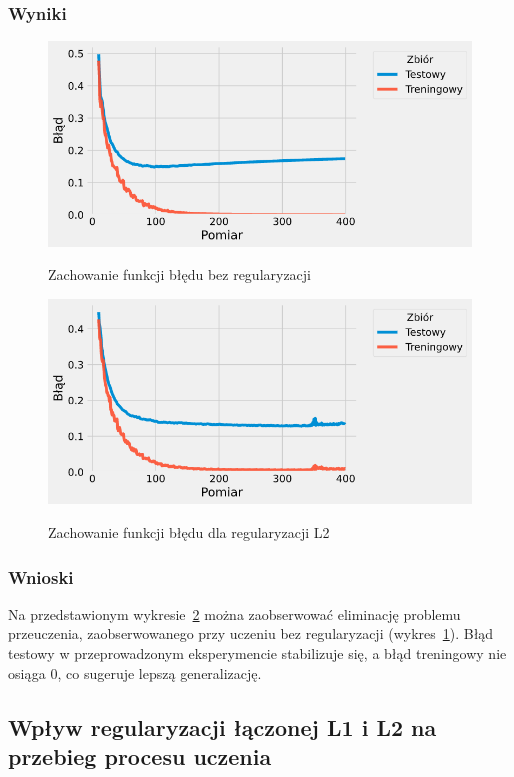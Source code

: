 \documentclass{article}
\begin{document}
\subsubsection*{Wyniki}
\begin{figure}[H]
	\centering
	\caption{Zachowanie funkcji błędu bez regularyzacji}
	\includegraphics[width=\textwidth]{drop_err_0.png}
	\label{fig:res31}
\end{figure}
\begin{figure}[H]
	\centering
	\caption{Zachowanie funkcji błędu dla regularyzacji L2}
	\includegraphics[width=\textwidth]{reg_err_l2.png}
	\label{fig:res32}
\end{figure}


\subsubsection*{Wnioski}
Na przedstawionym wykresie~\ref{fig:res32} można zaobserwować eliminację problemu przeuczenia, zaobserwowanego przy uczeniu bez regularyzacji (wykres~\ref{fig:res31}). Błąd testowy w przeprowadzonym eksperymencie stabilizuje się, a błąd treningowy nie osiąga 0, co sugeruje lepszą generalizację.

\newpage
\subsection{Wpływ regularyzacji łączonej L1 i L2 na przebieg procesu uczenia}
\end{document}
